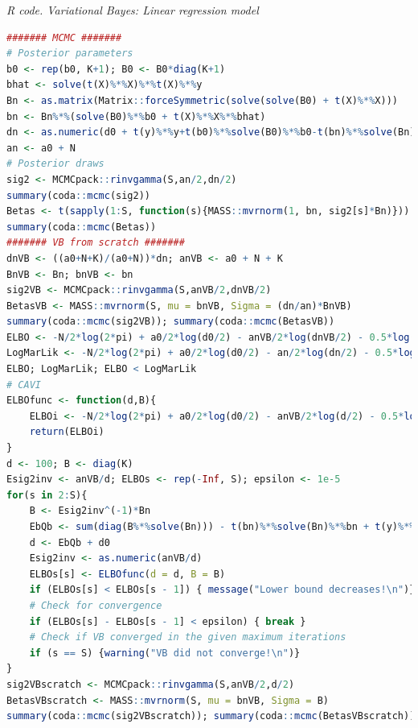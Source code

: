 \begin{tcolorbox}[enhanced,width=4.67in,center upper,
	fontupper=\large\bfseries,drop shadow southwest,sharp corners]
	\textit{R code. Variational Bayes: Linear regression model}
	\begin{VF}
		\begin{lstlisting}[language=R]
####### MCMC #######
# Posterior parameters
b0 <- rep(b0, K+1); B0 <- B0*diag(K+1)
bhat <- solve(t(X)%*%X)%*%t(X)%*%y
Bn <- as.matrix(Matrix::forceSymmetric(solve(solve(B0) + t(X)%*%X)))
bn <- Bn%*%(solve(B0)%*%b0 + t(X)%*%X%*%bhat)
dn <- as.numeric(d0 + t(y)%*%y+t(b0)%*%solve(B0)%*%b0-t(bn)%*%solve(Bn)%*%bn)
an <- a0 + N
# Posterior draws
sig2 <- MCMCpack::rinvgamma(S,an/2,dn/2)
summary(coda::mcmc(sig2))
Betas <- t(sapply(1:S, function(s){MASS::mvrnorm(1, bn, sig2[s]*Bn)}))
summary(coda::mcmc(Betas))
####### VB from scratch #######
dnVB <- ((a0+N+K)/(a0+N))*dn; anVB <- a0 + N + K
BnVB <- Bn; bnVB <- bn
sig2VB <- MCMCpack::rinvgamma(S,anVB/2,dnVB/2) 
BetasVB <- MASS::mvrnorm(S, mu = bnVB, Sigma = (dn/an)*BnVB)
summary(coda::mcmc(sig2VB)); summary(coda::mcmc(BetasVB))
ELBO <- -N/2*log(2*pi) + a0/2*log(d0/2) - anVB/2*log(dnVB/2) - 0.5*log(det(B0)) + 0.5*log(det(BnVB)) - lgamma(a0/2) + lgamma(anVB/2) - K/2*log(anVB/dnVB) + K/2
LogMarLik <- -N/2*log(2*pi) + a0/2*log(d0/2) - an/2*log(dn/2) - 0.5*log(det(B0)) + 0.5*log(det(Bn)) - lgamma(a0/2) + lgamma(an/2)
ELBO; LogMarLik; ELBO < LogMarLik 
# CAVI
ELBOfunc <- function(d,B){
	ELBOi <- -N/2*log(2*pi) + a0/2*log(d0/2) - anVB/2*log(d/2) - 0.5*log(det(B0)) + 0.5*log(det(B)) - lgamma(a0/2) + lgamma(anVB/2) - K/2*log(anVB/d) + 0.5*(anVB/d)*sum(diag(B%*%solve(Bn)))
	return(ELBOi)
}
d <- 100; B <- diag(K) 
Esig2inv <- anVB/d; ELBOs <- rep(-Inf, S); epsilon <- 1e-5
for(s in 2:S){
	B <- Esig2inv^(-1)*Bn
	EbQb <- sum(diag(B%*%solve(Bn))) - t(bn)%*%solve(Bn)%*%bn + t(y)%*%y + t(b0)%*%solve(B0)%*%b0
	d <- EbQb + d0
	Esig2inv <- as.numeric(anVB/d)
	ELBOs[s] <- ELBOfunc(d = d, B = B)
	if (ELBOs[s] < ELBOs[s - 1]) { message("Lower bound decreases!\n")}
	# Check for convergence
	if (ELBOs[s] - ELBOs[s - 1] < epsilon) { break }
	# Check if VB converged in the given maximum iterations
	if (s == S) {warning("VB did not converge!\n")}
}
sig2VBscratch <- MCMCpack::rinvgamma(S,anVB/2,d/2) 
BetasVBscratch <- MASS::mvrnorm(S, mu = bnVB, Sigma = B)
summary(coda::mcmc(sig2VBscratch)); summary(coda::mcmc(BetasVBscratch))
\end{lstlisting}
	\end{VF}
\end{tcolorbox}

